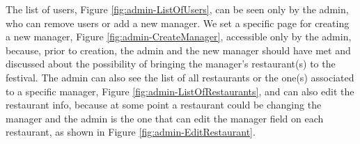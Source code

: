 \begin{center}
    \label{fig:admin-ListOfRestaurants}
\end{center}

\begin{center}
    \label{fig:admin-EditRestaurant}
\end{center}

The list of users, Figure \ref{fig:admin-ListOfUsers}, can be seen only by the admin, who can remove users or add a new manager.
We set a specific page for creating a new manager, Figure \ref{fig:admin-CreateManager}, accessible only by the admin, because, prior to creation, the admin and the new manager should have met and discussed about the possibility of bringing the manager's restaurant(s) to the festival. The admin can also see the list of all restaurants or the one(s) associated to a specific manager, Figure \ref{fig:admin-ListOfRestaurants}, and can also edit the restaurant info, because at some point a restaurant could be changing the manager and the admin is the one that can edit the manager field on each restaurant, as shown in Figure \ref{fig:admin-EditRestaurant}.